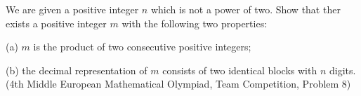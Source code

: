 We are given a positive integer $n$ which is not a power of two. Show that ther exists a positive integer $m$ with the following two properties:

(a) $m$ is the product of two consecutive positive integers;

(b) the decimal representation of $m$ consists of two identical blocks with $n$ digits.(4th Middle European Mathematical Olympiad, Team Competition, Problem 8)